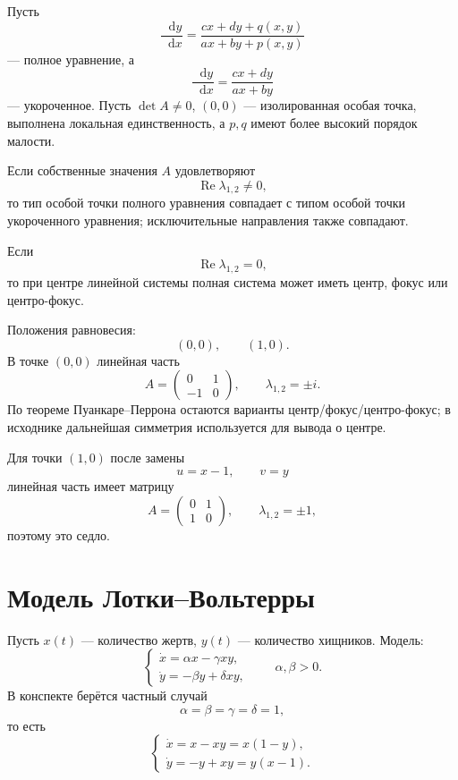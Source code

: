 \documentclass[12pt,a4paper]{article}
\numberwithin{equation}{section}
\renewcommand{\Re}{\operatorname{Re}}
\newcommand{\dd}{\mathop{}\!\mathrm{d}}
\DeclareRobustCommand{\examtag}[1]{\space{\normalfont\small\color{HSEgray}(#1)}}
\begin{document}
\begin{theoremHSE}
Пусть
\[
\frac{\dd y}{\dd x}
=
\frac{cx+dy+q(x,y)}{ax+by+p(x,y)}
\]
--- полное уравнение, а
\[
\frac{\dd y}{\dd x}
=
\frac{cx+dy}{ax+by}
\]
--- укороченное. Пусть $\det A\neq0$, $(0,0)$ --- изолированная особая точка, выполнена локальная единственность, а $p,q$ имеют более высокий порядок малости.

Если собственные значения $A$ удовлетворяют
\[
\Re\lambda_{1,2}\neq0,
\]
то тип особой точки полного уравнения совпадает с типом особой точки укороченного уравнения; исключительные направления также совпадают.

Если
\[
\Re\lambda_{1,2}=0,
\]
то при центре линейной системы полная система может иметь центр, фокус или центро-фокус.
\end{theoremHSE}

\begin{exampleHSE}[Система $\dot x=y$, $\dot y=-x+x^2$]
Положения равновесия:
\[
(0,0),\qquad(1,0).
\]
В точке $(0,0)$ линейная часть
\[
A=\begin{pmatrix}0&1\\-1&0\end{pmatrix},
\qquad \lambda_{1,2}=\pm i.
\]
По теореме Пуанкаре--Перрона остаются варианты центр/фокус/центро-фокус; в исходнике дальнейшая симметрия используется для вывода о центре.

Для точки $(1,0)$ после замены
\[
u=x-1,\qquad v=y
\]
линейная часть имеет матрицу
\[
A=\begin{pmatrix}0&1\\1&0\end{pmatrix},
\qquad \lambda_{1,2}=\pm1,
\]
поэтому это седло.
\end{exampleHSE}

\section{Модель Лотки--Вольтерры\examtag{вопрос~30}}

Пусть $x(t)$ --- количество жертв, $y(t)$ --- количество хищников. Модель:
\[
\begin{cases}
\dot x=\alpha x-\gamma xy,\\
\dot y=-\beta y+\delta xy,
\end{cases}
\qquad \alpha,\beta>0.
\]
В конспекте берётся частный случай
\[
\alpha=\beta=\gamma=\delta=1,
\]
то есть
\begin{equation}
\begin{cases}
\dot x=x-xy=x(1-y),\\
\dot y=-y+xy=y(x-1).
\end{cases}
\label{eq:lotka}
\end{equation}
\end{document}
